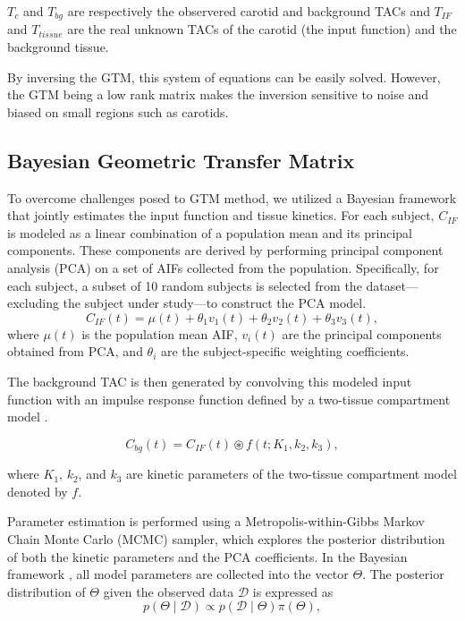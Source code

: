 $T_{c}$ and $T_{bg}$ are respectively the observered carotid and background TACs and $T_{IF}$ and $T_{tissue}$ are the real unknown TACs of the carotid (the input function) and the background tissue.

By inversing the GTM, this system of equations can be easily solved. However, the GTM being a low rank matrix makes the inversion sensitive to noise and biased on small regions such as carotids.

\subsection{Bayesian Geometric Transfer Matrix}
To overcome challenges posed to GTM method, we utilized a Bayesian framework that jointly estimates the input function and tissue kinetics.
For each subject, $C_{IF}$ is modeled as a linear combination of a population mean and its principal components.
These components are derived by performing principal component analysis (PCA) on a set of AIFs collected from the population. Specifically, for each subject, a subset of 10 random subjects is selected from the dataset—excluding the subject under study—to construct the PCA model.
\begin{equation}
	C_{IF}(t) = \mu(t) + \theta_{1} v_{1}(t) + \theta_{2} v_{2}(t) + \theta_{3} v_{3}(t),
\end{equation}
where \(\mu(t)\) is the population mean AIF, \(v_{i}(t)\) are the principal components obtained from PCA, and \(\theta_{i}\) are the subject-specific weighting coefficients.

The background TAC is then generated by convolving this modeled input function with an impulse response function defined by a two-tissue compartment model \cite{jouvie2013estimation}.

\begin{equation}
	C_{bg}(t) = C_{IF}(t) \circledast f(t; K_1, k_2, k_3),
\end{equation}

where $K_1$, $k_2$, and $k_3$ are kinetic parameters of the two-tissue compartment model denoted by $f$.

Parameter estimation is performed using a Metropolis-within-Gibbs Markov Chain Monte Carlo (MCMC) sampler, which explores the posterior distribution of both the kinetic parameters and the PCA coefficients.
In the Bayesian framework \cite{irace2021bayesian}, all model parameters are collected into the vector $\Theta$. The posterior distribution of $\Theta$ given the observed data $\mathcal{D}$ is expressed as
\begin{equation}
	p(\Theta \mid \mathcal{D}) \propto p(\mathcal{D} \mid \Theta) \pi(\Theta),
\end{equation}


